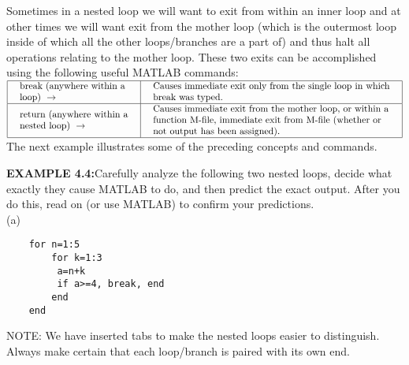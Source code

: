 \documentclass[../main.tex]{subfiles}
\begin{document}
Sometimes in a nested loop we will want to exit from within an inner loop and at
other times we will want exit from the mother loop (which is the outermost loop
inside of which all the other loops/branches are a part of) and thus halt all
operations relating to the mother loop. These two exits can be accomplished
using the following useful MATLAB commands: 
\\
$
\begin{array}{|l|l|}
\hline \begin{array}{l}
\text { break (anywhere within a } \\
\text { loop) } \rightarrow
\end{array} & \begin{array}{l}
\text { Causes immediate exit only from the single loop in which } \\
\text { break was typed. }
\end{array} \\
\hline \begin{array}{l}
\text { return (anywhere within a } \\
\text { nested loop) } \rightarrow
\end{array} & \begin{array}{l}
\text { Causes immediate exit from the mother loop, or within a } \\
\text { function M-file, immediate exit from M-file (whether or } \\
\text { not output has been assigned). }
\end{array} \\
\hline
\end{array}
$\\

The next example illustrates some of the preceding concepts and commands.

\textbf{EXAMPLE 4.4:}Carefully analyze the following two nested loops, decide what
exactly they cause MATLAB to do, and then predict the exact output. After you
do this, read on (or use MATLAB) to confirm your predictions. \\
(a) 
\begin{verbatim}
	for n=1:5
		for k=1:3
		 a=n+k
	  	 if a>=4, break, end
		end
	end 
\end{verbatim}

NOTE: We have inserted tabs to make the nested loops easier to distinguish.
Always make certain that each loop/branch is paired with its own end. \\
\end{document}
